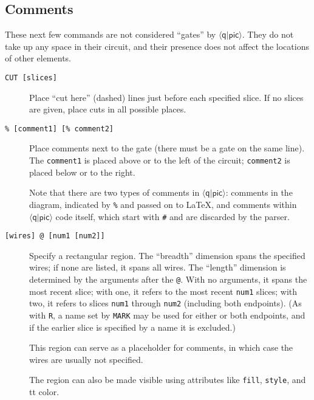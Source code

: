 \documentclass[twoside,12pt]{article}
\newcommand{\qpic}{$\langle\mathsf{q}|\mathsf{pic}\rangle$\xspace}
\begin{document}
\subsection{Comments}
\label{sec-comment}

These next few commands are not considered ``gates'' by \qpic.  They do not take up
any space
in their circuit, and their presence does not affect the locations of other elements.

\begin{description}

\item[{\tt CUT [slices]}] Place ``cut here'' (dashed) lines just before each specified slice.  If no slices
are given, place cuts in all possible places.

\begin{minipage}[b]{2in}

\end{minipage} \hfill 

\item[{\tt \% [comment1] [\% comment2]}] Place comments next to the
  gate (there must be a gate on the same line).  The {\tt comment1} is
  placed above or to the left of the circuit; {\tt comment2} is placed
  below or to the right.

\begin{minipage}[b]{2in}

\end{minipage} \hfill 

Note that there are two types of comments in \qpic:  comments in the diagram, indicated by {\tt \%} and passed on to
\LaTeX, and comments within \qpic code itself, which start with {\tt \#} and are discarded by the parser.

\item[{\tt [wires] @ [num1 [num2]]}] Specify a rectangular region.  The
  ``breadth'' dimension spans the specified wires; if none are listed, it spans all wires.
  The ``length'' dimension is determined by the arguments after the {\tt @}.  With no
  arguments, it spans the most recent slice; with one, it refers to the most recent
  {\tt num1} slices; with two, it refers to slices {\tt num1} through {\tt num2}
  (including both endpoints).  (As with {\tt R}, a name set by {\tt MARK} may be used
  for either or both endpoints, and if the earlier slice is specified by a name it
  is excluded.)

  This region can serve as a placeholder for comments, in which case the wires are
  usually not specified.

\begin{minipage}[b]{2in}

\end{minipage} \hfill 

The region can also be made visible using attributes like {\tt fill}, {\tt style},
and {tt color}.

\begin{minipage}[b]{4.5in}

\end{minipage} \hfill 
\end{description}
\end{document}
